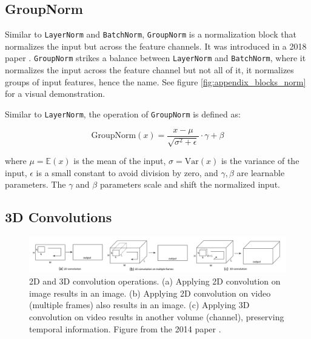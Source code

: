 \subsection*{GroupNorm}

Similar to \texttt{LayerNorm} and \texttt{BatchNorm}, \texttt{GroupNorm} is a normalization block that normalizes the input but across the feature channels. It was introduced in a 2018 paper \cite{wu2018group}. \texttt{GroupNorm} strikes a balance between \texttt{LayerNorm} and \texttt{BatchNorm}, where it normalizes the input across the feature channel but not all of it, it normalizes groups of input features, hence the name. See figure \ref{fig:appendix_blocks_norm} for a visual demonstration.

Similar to \texttt{LayerNorm}, the operation of \texttt{GroupNorm} is defined as:

\begin{equation*}
    \text{GroupNorm}(x) = \frac{x - \mu}{\sqrt{\sigma^2 + \epsilon}} \cdot \gamma + \beta
\end{equation*}

where $\mu = \mathbb{E}(x)$ is the mean of the input, $\sigma = \text{Var} (x)$ is the variance of the input, $\epsilon$ is a small constant to avoid division by zero, and $\gamma, \beta$ are learnable parameters. The $\gamma$ and $\beta$ parameters scale and shift the normalized input.










\subsection{3D Convolutions}
\label{appendix:blocks_3dconv}

\begin{figure}
    \centering
    \includegraphics[width=1\textwidth]{images/appendix/blocks/3d_conv.png}
    \caption{2D and 3D convolution operations. (a) Applying 2D convolution on image results in an image. (b) Applying 2D convolution on video (multiple frames) also results in an image. (c) Applying 3D convolution on video results in another volume (channel), preserving temporal information. Figure from the 2014 paper \cite{tran2015learning}.}
    \label{fig:appendix_blocks_3dconv}
\end{figure}

